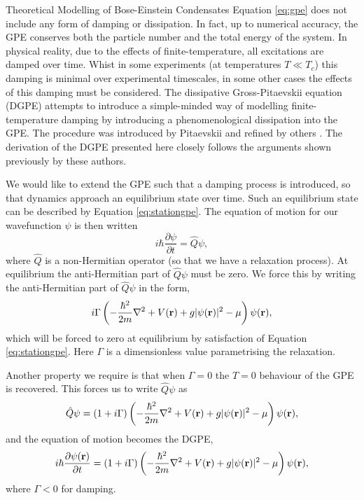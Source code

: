 \begin{chapter}{\label{cha:theoretical_model}Theoretical Modelling of Bose-Einstein Condensates}
	Equation \ref{eq:gpe} does not include any form of damping or dissipation. In fact, up to numerical accuracy, the GPE conserves both the particle number and the total energy of the system. In physical reality, due to the effects of finite-temperature, all excitations are damped over time. Whist in some experiments (at temperatures $T\ll T_c$) this damping is minimal over experimental timescales, in some other cases the effects of this damping must be considered. The dissipative Gross-Pitaevskii equation (DGPE) attempts to introduce a simple-minded way of modelling finite-temperature damping by introducing a phenomenological dissipation into the GPE. The procedure was introduced by Pitaevskii \cite{lifshitzpitaevskii81} and refined by others \cite{choi_morgan_98,tsubota_kasamatsu_02,madarassy_barenghi_08}. The derivation of the DGPE presented here closely follows the arguments shown previously by these authors.

	We would like to extend the GPE such that a damping process is introduced, so that dynamics approach an equilibrium state over time. Such an equilibrium state can be described by Equation \ref{eq:stationgpe}. The equation of motion for our wavefunction $\psi$ is then written 
		\begin{equation}\label{eq:disseqmotion}
		i\hbar \frac{\partial \psi}{\partial t} = \hat{Q}\psi,
		\end{equation}
	where $\hat{Q}$ is a non-Hermitian operator (so that we have a relaxation process). At equilibrium the anti-Hermitian part of $\hat{Q}\psi$ must be zero. We force this by writing the anti-Hermitian part of $\hat{Q}\psi$ in the form,
	\begin{equation*}\label{eq:dissantiherm}
		i\Gamma\left( -\frac{\hbar^2}{2m}\nabla^2 + V({\bf r}) + g|\psi({\bf r})|^2 - \mu \right) \psi({\bf r}),
	\end{equation*}
	which will be forced to zero at equilibrium by satisfaction of Equation \ref{eq:stationgpe}. Here $\Gamma$ is a dimensionless value parametrising the relaxation.

	Another property we require is that when $\Gamma=0$ the $T=0$ behaviour of the GPE is recovered. This forces us to write $\hat{Q}\psi$ as
	\begin{equation*}\label{eq:dissantiherm2}
		\hat{Q}\psi = (1+i\Gamma)\left( -\frac{\hbar^2}{2m}\nabla^2 + V({\bf r}) + g|\psi({\bf r})|^2 - \mu \right) \psi({\bf r}),
	\end{equation*}
	and the equation of motion becomes the DGPE,
	\begin{equation}\label{eq:dissgpeA}
		i\hbar \frac{\partial \psi({\bf r})}{\partial t} = (1+i\Gamma)\left( -\frac{\hbar^2 }{2m}\nabla^2 + V({\bf r}) + g|\psi({\bf r})|^2- \mu \right) \psi({\bf r}),
	\end{equation}
	where $\Gamma<0$ for damping.


\end{chapter}
